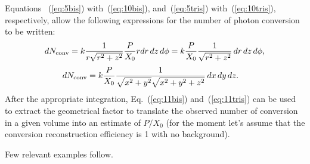 Equations
~(\ref{eq:5bis})
with~(\ref{eq:10bis}), and~(\ref{eq:5tris}) with~(\ref{eq:10tris}),
respectively, allow the following expressions for the number of photon
conversion to be written:
\begin{equation}
d N_{\rm conv} = k \frac{1}{r\sqrt{r^2+z^2}} 
\frac{P}{X_0} r dr\, dz\, d\phi = k
\frac{P}{X_0} \frac{1}{\sqrt{r^2+z^2}}\, dr\, dz\, d\phi ,
\label{eq:11bis}
\end{equation}
\begin{equation}
\begin{split}
d N_{\rm conv} & = k \frac{P}{X_0} \frac{1}{\sqrt{x^2+y^2}\sqrt{x^2+y^2+z^2}} \,dx\,dy\,dz .
\end{split}
\label{eq:11tris}
\end{equation}
After the appropriate integration,
Eq.~(\ref{eq:11bis}) and~(\ref{eq:11tris}) can be used to extract the
geometrical factor to translate the observed number of conversion in a given 
volume into an estimate of $P/X_0$ (for the moment let's assume that
the conversion reconstruction efficiency is 1 with no background).

Few relevant examples follow.

